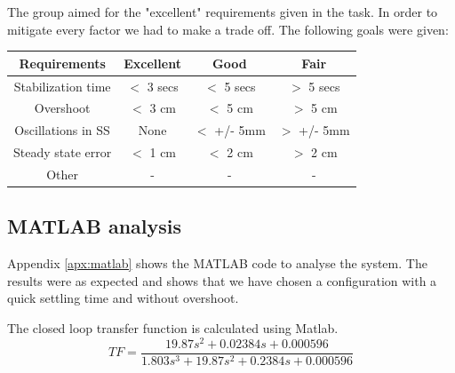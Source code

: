 The group aimed for the "excellent" requirements given in the task. In order to mitigate every factor we had to make a trade off. The following goals were given:
\begin{center}
\begin{tabular}{ |c|c|c|c|}
 \hline
 Requirements & Excellent & Good & Fair \\
 \hline
 Stabilization time & $<$ 3 secs & $<$ 5 secs & $>$ 5 secs\\ 
 \hline
 Overshoot & $<$ 3 cm & $<$ 5 cm & $>$ 5 cm \\  
 \hline
 Oscillations in SS & None & $<$ +/- 5mm & $>$ +/- 5mm \\
 \hline
 Steady state error & $<$ 1 cm & $<$ 2 cm & $>$ 2 cm \\
 \hline
 Other & - & - & - \\
 \hline
\end{tabular}
\end{center}

\subsection{MATLAB analysis}

Appendix \ref{apx:matlab} shows the MATLAB code to analyse the system. The results were as expected and shows that we have chosen a configuration with a quick settling time and without overshoot.

The closed loop transfer function is calculated using Matlab.
\begin{equation}
    TF = \frac{19.87s^2+0.02384s+0.000596}{1.803s^3+19.87s^2+0.2384s+0.000596}
\end{equation}

